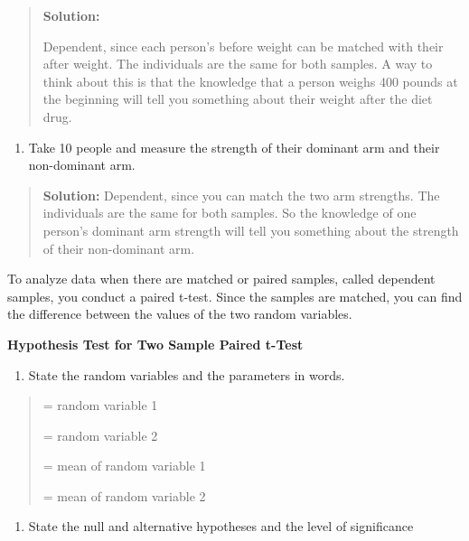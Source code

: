 \documentclass[]{book}
\providecommand{\tightlist}{%
  \setlength{\itemsep}{0pt}\setlength{\parskip}{0pt}}
\begin{document}
\begin{quote}
\textbf{Solution:}

Dependent, since each person's before weight can be matched with their after weight. The individuals are the same for both samples. A way to think about this is that the knowledge that a person weighs 400 pounds at the beginning will tell you something about their weight after the diet drug.
\end{quote}

\begin{enumerate}
\def\labelenumi{\alph{enumi}.}
\setcounter{enumi}{2}
\tightlist
\item
  Take 10 people and measure the strength of their dominant arm and their non-dominant arm.
\end{enumerate}

\begin{quote}
\textbf{Solution:}
Dependent, since you can match the two arm strengths. The individuals are the same for both samples. So the knowledge of one person's dominant arm strength will tell you something about the strength of their non-dominant arm.
\end{quote}

To analyze data when there are matched or paired samples, called dependent samples, you conduct a paired t-test. Since the samples are matched, you can find the difference between the values of the two random variables.

\textbf{Hypothesis Test for Two Sample Paired t-Test}

\begin{enumerate}
\def\labelenumi{\arabic{enumi}.}
\tightlist
\item
  State the random variables and the parameters in words.
\end{enumerate}

\begin{quote}
= random variable 1

= random variable 2

= mean of random variable 1

= mean of random variable 2
\end{quote}

\begin{enumerate}
\def\labelenumi{\arabic{enumi}.}
\setcounter{enumi}{1}
\tightlist
\item
  State the null and alternative hypotheses and the level of significance
\end{enumerate}
\end{document}
